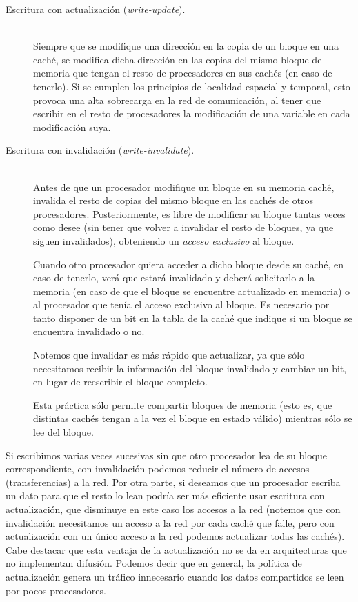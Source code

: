 \begin{description}
    \item [Escritura con actualización (\emph{write-update}).]~\\
        Siempre que se modifique una dirección en la copia de un bloque en una caché, se modifica dicha dirección en las copias del mismo bloque de memoria que tengan el resto de procesadores en sus cachés (en caso de tenerlo). Si se cumplen los principios de localidad espacial y temporal, esto provoca una alta sobrecarga en la red de comunicación, al tener que escribir en el resto de procesadores la modificación de una variable en cada modificación suya.
    \item [Escritura con invalidación (\emph{write-invalidate}).]~\\ 
        Antes de que un procesador modifique un bloque en su memoria caché, invalida el resto de copias del mismo bloque en las cachés de otros procesadores. Posteriormente, es libre de modificar su bloque tantas veces como desee (sin tener que volver a invalidar el resto de bloques, ya que siguen invalidados), obteniendo un \emph{acceso exclusivo} al bloque. 

        Cuando otro procesador quiera acceder a dicho bloque desde su caché, en caso de tenerlo, verá que estará invalidado y deberá solicitarlo a la memoria (en caso de que el bloque se encuentre actualizado en memoria) o al procesador que tenía el acceso exclusivo al bloque. Es necesario por tanto disponer de un bit en la tabla de la caché que indique si un bloque se encuentra invalidado o no.

        Notemos que invalidar es más rápido que actualizar, ya que sólo necesitamos recibir la información del bloque invalidado y cambiar un bit, en lugar de reescribir el bloque completo. 

        Esta práctica sólo permite compartir bloques de memoria (esto es, que distintas cachés tengan a la vez el bloque en estado válido) mientras sólo se lee del bloque.
\end{description}
Si escribimos varias veces sucesivas sin que otro procesador lea de su bloque correspondiente, con invalidación podemos reducir el número de accesos (transferencias) a la red. Por otra parte, si deseamos que un procesador escriba un dato para que el resto lo lean podría ser más eficiente usar escritura con actualización, que disminuye en este caso los accesos a la red (notemos que con invalidación necesitamos un acceso a la red por cada caché que falle, pero con actualización con un único acceso a la red podemos actualizar todas las cachés). Cabe destacar que esta ventaja de la actualización no se da en arquitecturas que no implementan difusión. Podemos decir que en general, la política de actualización genera un tráfico innecesario cuando los datos compartidos se leen por pocos procesadores.\\


